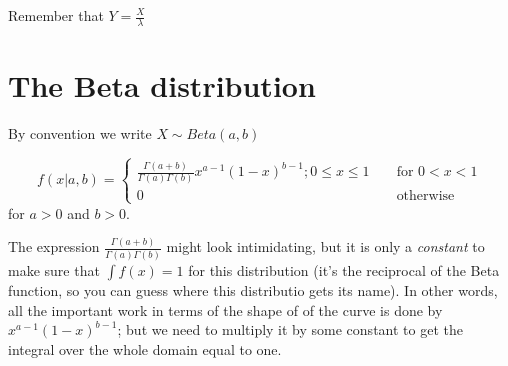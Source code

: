 \documentclass[12pt]{extbook}
\begin{document}





Remember that $Y = \frac{X}{\lambda}$












\section{The Beta distribution}

{\color{green} By convention we write $X \sim Beta(a,b)$}

\begin{displaymath}
f(x|a,b) = \left\{ \begin{array}{rrr} \frac{\Gamma(a + b)}{\Gamma(a)\Gamma(b)} x^{a-1}(1-x)^{b-1};0 \leq x \leq 1 & & \mbox{ for } 0 < x < 1 \\ 0 & & \mbox{ otherwise} \end{array} \right.
\end{displaymath}
for $a>0$ and $b>0$.

The expression $\frac{\Gamma(a + b)}{\Gamma(a)\Gamma(b)}$ might look intimidating, but it is only a \emph{constant} to make sure that $\int f(x)=1$ for this distribution (it's the reciprocal of the Beta function, so you can guess where this distributio gets its name).   In other words, all the important work in terms of the shape of of the curve is done by $ x^{a-1}(1-x)^{b-1}$; but we need to multiply it by some constant to get the integral over the whole domain equal to one.
\end{document}
